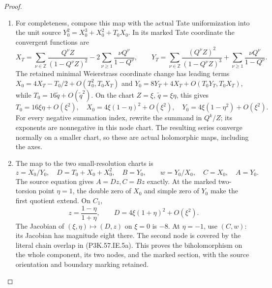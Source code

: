 \begin{proof}
\begin{enumerate}[label=\arabic*.]
\item For completeness, compose this map with the actual
Tate uniformization into the unit source
\(Y_0^2=X_0^3+X_0^2+T_0X_0\). In its marked Tate
coordinate the convergent functions are
\[
 X_T=\sum_{\nu\in\mathbb Z}
       \frac{Q^\nu Z}{(1-Q^\nu Z)^2}
       -2\sum_{\nu\ge1}\frac{\nu Q^\nu}{1-Q^\nu},
 \qquad
 Y_T=\sum_{\nu\in\mathbb Z}
       \frac{(Q^\nu Z)^2}{(1-Q^\nu Z)^3}
       +\sum_{\nu\ge1}\frac{\nu Q^\nu}{1-Q^\nu}.
\]
The retained minimal Weierstrass coordinate change
has leading terms
\(X_0=4X_T-T_0/2+O(T_0^2,T_0X_T)\) and
\(Y_0=8Y_T+4X_T+O(T_0Y_T,T_0X_T)\), while
\(T_0=16\widetilde q+O(\widetilde q^2)\).
On the chart \(Z=\xi\),
\(\widetilde q=\xi\eta\), this gives
\[
 T_0=16\xi\eta+O(\xi^2),\quad
 X_0=4\xi(1-\eta)^2+O(\xi^2),\quad
 Y_0=4\xi(1-\eta^2)+O(\xi^2).                       \tag{P3K.57.IE.5b}
\]
For every negative summation index, rewrite the
summand in \(Q^k/Z\); its exponents are nonnegative
in this node chart. The resulting series converge
normally on a smaller chart, so these are actual
holomorphic maps, including the axes.

\item The map to the two small-resolution charts is
\[
 z=X_0/Y_0,\quad D=T_0+X_0+X_0^2,\quad B=Y_0,
 \qquad
 w=Y_0/X_0,\quad C=X_0,\quad A=Y_0.                 \tag{P3K.57.IE.5c}
\]
The source equation gives \(A=Dz,C=Bz\) exactly.
At the marked two-torsion point \(\eta=1\), the
double zero of \(X_0\) and simple zero of \(Y_0\)
make the first quotient extend. On \(C_1\),
\[
 z=\frac{1-\eta}{1+\eta},\qquad
 D=4\xi(1+\eta)^2+O(\xi^2).
\]
The Jacobian of \((\xi,\eta)\mapsto(D,z)\) on
\(\xi=0\) is \(-8\). At \(\eta=-1\), use
\((C,w)\): its Jacobian has magnitude eight there.
The second node is covered by the literal chain
overlap in (P3K.57.IE.5a). This proves the biholomorphism
on the whole component, its two nodes, and the
marked section, with the source orientation and
boundary marking retained.


\end{enumerate}
\end{proof}

